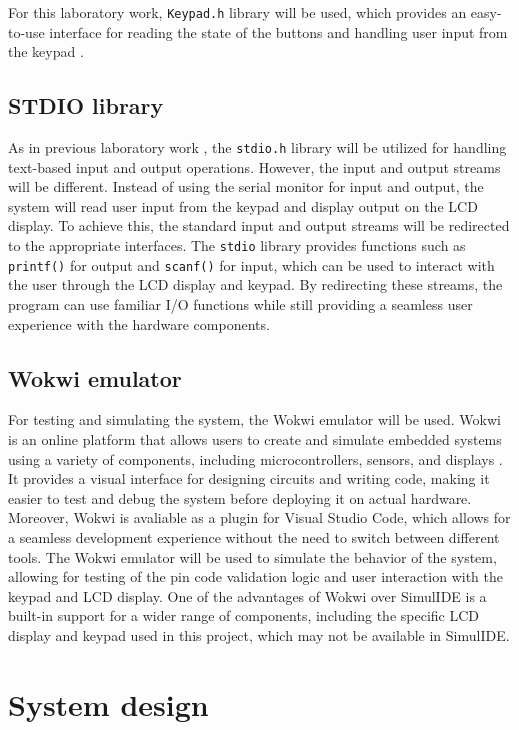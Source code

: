 For this laboratory work, \texttt{Keypad.h} library will be used, which provides an easy-to-use interface for reading the state of the buttons and handling user input from the keypad \cite{keypad}.



\subsection{STDIO library}

As in previous laboratory work \cite{lab1_1}, the \texttt{stdio.h} library will be utilized for handling text-based input and output operations. However, the input and output streams will be different. Instead of using the serial monitor for input and output, the system will read user input from the keypad and display output on the LCD display. To achieve this, the standard input and output streams will be redirected to the appropriate interfaces. The \texttt{stdio} library provides functions such as \texttt{printf()} for output and \texttt{scanf()} for input, which can be used to interact with the user through the LCD display and keypad. By redirecting these streams, the program can use familiar I/O functions while still providing a seamless user experience with the hardware components.

\subsection{Wokwi emulator}

For testing and simulating the system, the Wokwi emulator will be used. Wokwi is an online platform that allows users to create and simulate embedded systems using a variety of components, including microcontrollers, sensors, and displays \cite{wokwi}. It provides a visual interface for designing circuits and writing code, making it easier to test and debug the system before deploying it on actual hardware. Moreover, Wokwi is avaliable as a plugin for Visual Studio Code, which allows for a seamless development experience without the need to switch between different tools. The Wokwi emulator will be used to simulate the behavior of the system, allowing for testing of the pin code validation logic and user interaction with the keypad and LCD display. One of the advantages of Wokwi over SimulIDE is a built-in support for a wider range of components, including the specific LCD display and keypad used in this project, which may not be available in SimulIDE.

\section{System design}

